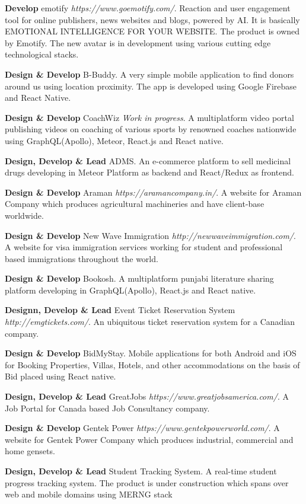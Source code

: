 \documentclass[margin,line]{res}
\begin{document}
\begin{resume}
\textbf{Develop} emotify {\em https://www.goemotify.com/}. Reaction and user engagement tool for online publishers, news websites and blogs, powered by AI. It is basically EMOTIONAL INTELLIGENCE FOR YOUR WEBSITE. The product is owned by Emotify. The new avatar is in development using various cutting edge technological stacks. 

\textbf{Design \& Develop} B-Buddy. A very simple mobile application to find donors around us using location proximity. The app is developed using Google Firebase and React Native. 

\textbf{Design \& Develop} CoachWiz {\em Work in progress}. A multiplatform video portal publishing videos on coaching of various sports by renowned coaches nationwide using GraphQL(Apollo), Meteor, React.js and React native. 

\textbf{Design, Develop \& Lead} ADMS. An e-commerce platform to sell medicinal drugs developing in Meteor Platform as backend and React/Redux as frontend.

\textbf{Design \& Develop} Araman {\em https://aramancompany.in/}. A website for Araman Company which produces agricultural machineries and have client-base worldwide.

\textbf{Design \& Develop} New Wave Immigration {\em http://newwaveimmigration.com/}. A website for visa immigration services working for student and professional based immigrations throughout the world.

\textbf{Design \& Develop} Bookosh. A multiplatform punjabi literature sharing platform developing in GraphQL(Apollo), React.js and React native.

\textbf{Designn, Develop \& Lead} Event Ticket Reservation System {\em http://emgtickets.com/}. An ubiquitous ticket reservation system for a Canadian company.

\textbf{Design \& Develop} BidMyStay. Mobile applications for both Android and iOS for Booking Properties, Villas, Hotels, and other accommodations on the basis of Bid placed using React native.

\textbf{Design, Develop \& Lead} GreatJobs {\em https://www.greatjobsamerica.com/}. A Job Portal for Canada based Job Consultancy company.

\textbf{Design \& Develop} Gentek Power {\em https://www.gentekpowerworld.com/}. A website for Gentek Power Company which produces industrial, commercial and home gensets.

\textbf{Design, Develop \& Lead} Student Tracking System. A real-time student progress tracking system. The product is under construction which spans over web and mobile domains using MERNG stack


\end{resume}
\end{document}
